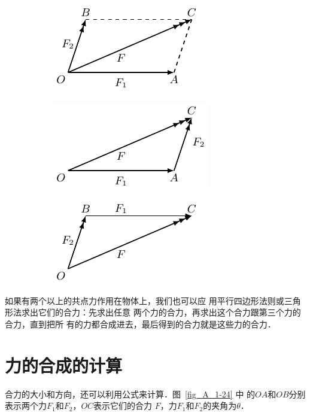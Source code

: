 \begin{figure}[htbp]
    \centering
    \begin{subfigure} {1\linewidth} 
        \centering
        \includegraphics{fig/A/1-23a.pdf} 
        \caption{} \label{fig_A_1-23a} 
    \end{subfigure} 
    \begin{subfigure} {0.45\linewidth} 
        \centering
        \includegraphics{fig/A/1-23b.pdf} 
        \caption{} \label{fig_A_1-23b} 
    \end{subfigure} 
    \begin{subfigure} {0.45\linewidth} 
        \centering
        \includegraphics{fig/A/1-23c.pdf} 
        \caption{} \label{fig_A_1-23c} 
    \end{subfigure} 
    \caption{} \label{fig_A_1-23} 
\end{figure} 

    如果有两个以上的共点力作用在物体上，我们也可以应
用平行四边形法则或三角形法求出它们的合力：先求出任意
两个力的合力，再求出这个合力跟第三个力的合力，直到把所
有的力都合成进去，最后得到的合力就是这些力的合力．

\section{力的合成的计算} 
    合力的大小和方向，还可以利用公式来计算．图~\ref{fig_A_1-24} 中
的$OA$和$OB$分别表示两个力$F_1$和$F_2$，$OC$表示它们的合力
$F$，力$F_1$和$F_2$的夹角为$\theta$．

